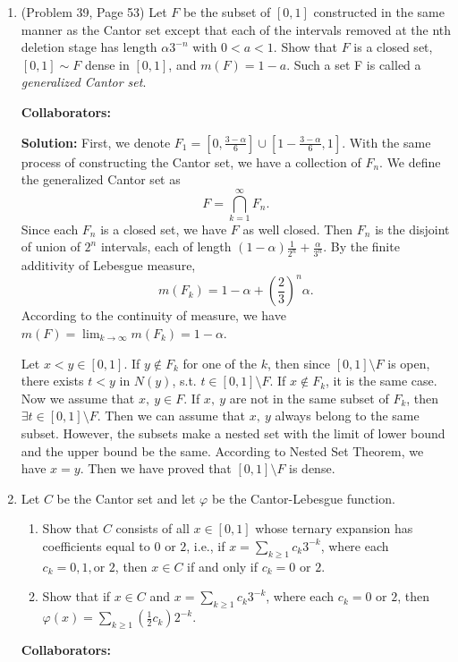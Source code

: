 \documentclass{article}%
\begin{document}
\begin{enumerate}
\bigskip



\item  (Problem 39, Page 53) Let $F$ be the subset of $[0, 1]$ constructed in the same manner as the Cantor set except that
each of the intervals removed at the nth deletion stage has length $\alpha 3^{-n}$ with $0 < a < 1$. Show
that $F$ is a closed set, $[0, 1]\sim F$ dense in $[0,1]$, and $m(F) = 1- a$. Such a set F is called a \emph{generalized Cantor set}.



\bigskip
\textbf{Collaborators:}\\
\smallskip
 
\textbf{Solution:}
First, we denote $F_1 = \left[0, \frac{3-\alpha}{6}\right]\cup \left[1-\frac{3-\alpha}{6}, 1\right]$. With the same process of constructing the Cantor set, we have a collection of $F_n$. We define the generalized Cantor set as 
$$
F = \bigcap_{k=1}^{\infty}F_n.
$$
Since each $F_n$ is a closed set, we have $F$ as well closed. Then $F_n$ is the disjoint of union of $2^n$ intervals, each of length $(1-\alpha)\frac{1}{2^n}+\frac{\alpha}{3^n}$. By the finite additivity of Lebesgue measure, 
$$
m(F_k) = 1-\alpha + \left(\frac{2}{3}\right)^n\alpha.
$$
According to the continuity of measure, we have $m(F) = \lim_{k\to\infty}m(F_k) = 1-\alpha$.

Let $x < y\in [0, 1]$. If $y\notin F_k$ for one of the $k$, then since $[0, 1]\setminus F$ is open, there exists $t < y$ in $N(y)$, s.t. $t\in [0, 1]\setminus F$. If $x\notin F_k$, it is the same case. Now we assume that $x, ~y \in F$. If $x, ~y$ are not in the same subset of $F_k$, then $\exists t\in [0, 1]\setminus F$. Then we can assume that $x, ~y$ always belong to the same subset. However, the subsets make a nested set with the limit of lower bound and the upper bound be the same. According to Nested Set Theorem, we have $x = y$. Then we have proved that $[0, 1]\setminus F$ is dense.
\bigskip

\item Let $C$ be the Cantor set and let $\varphi$ be the Cantor-Lebesgue function.
\begin{enumerate}
\item Show that $C$ consists of all $x\in [0,1]$ whose  ternary expansion has coefficients equal to $0$ or $2$, i.e., if $x = \sum_{k\geq 1} c_k3^{-k}$, where each $c_k = 0, 1, \text{or } 2$, then $x\in C$ if and only if $c_k = 0 \text{ or } 2$. 
\item Show that if $x\in C$ and $x = \sum_{k\geq 1} c_k3^{-k}$, where each $c_k = 0 \text{ or } 2$, then $\varphi(x) = \sum_{k\geq 1} (\frac{1}{2} c_k) 2^{-k}$.
\end{enumerate}
\bigskip
\textbf{Collaborators:}\\
\smallskip
 

\end{enumerate}
\end{document}
